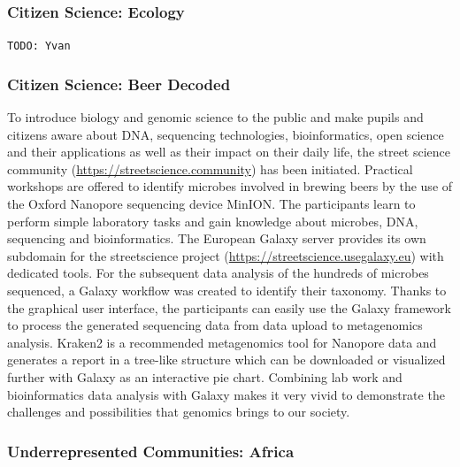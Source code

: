 \documentclass[10pt,letterpaper]{article}
\begin{document}
\subsubsection*{Citizen Science: Ecology}

\verb+TODO: Yvan+

\subsubsection*{Citizen Science: Beer Decoded}

To introduce biology and genomic science to the public and make pupils and citizens aware about DNA, sequencing technologies, bioinformatics, open science and their applications as well as their impact on their daily life, the street science community (\url{https://streetscience.community}) has been initiated.
Practical workshops are offered to identify microbes involved in brewing beers by the use of the Oxford Nanopore sequencing device MinION\@.
The participants learn to perform simple laboratory tasks and gain knowledge about microbes, DNA, sequencing and bioinformatics.
The European Galaxy server provides its own subdomain for the streetscience project (\url{https://streetscience.usegalaxy.eu}) with dedicated tools.
For the subsequent data analysis of the hundreds of microbes sequenced, a Galaxy workflow was created to identify their taxonomy.
Thanks to the graphical user interface, the participants can easily use the Galaxy framework to process the generated sequencing data from data upload to  metagenomics analysis.
Kraken2 \cite{wood2019improved} is a recommended metagenomics tool for Nanopore data and generates a report in a tree-like structure which can be downloaded or visualized further with Galaxy as an interactive pie chart.
Combining lab work and bioinformatics data analysis with Galaxy makes it very vivid to demonstrate the challenges and possibilities that genomics brings to our society.


\subsubsection*{Underrepresented Communities: Africa}
\end{document}
